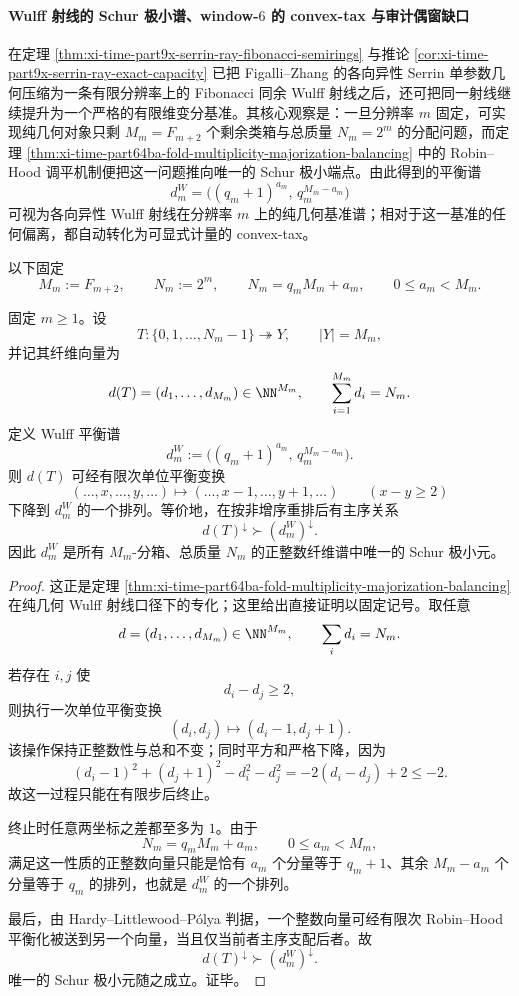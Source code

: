 \paragraph{Wulff 射线的 Schur 极小谱、window-\texorpdfstring{$6$}{6} 的 convex-tax 与审计偶窗缺口}
在定理 \ref{thm:xi-time-part9x-serrin-ray-fibonacci-semirings} 与推论 \ref{cor:xi-time-part9x-serrin-ray-exact-capacity} 已把 Figalli--Zhang 的各向异性 Serrin 单参数几何压缩为一条有限分辨率上的 Fibonacci 同余 Wulff 射线之后，还可把同一射线继续提升为一个严格的有限维变分基准。其核心观察是：一旦分辨率 \(m\) 固定，可实现纯几何对象只剩 \(M_m=F_{m+2}\) 个剩余类箱与总质量 \(N_m=2^m\) 的分配问题，而定理 \ref{thm:xi-time-part64ba-fold-multiplicity-majorization-balancing} 中的 Robin--Hood 调平机制便把这一问题推向唯一的 Schur 极小端点。由此得到的平衡谱
\[
d_m^{W}=\bigl((q_m+1)^{a_m},\,q_m^{M_m-a_m}\bigr)
\]
可视为各向异性 Wulff 射线在分辨率 \(m\) 上的纯几何基准谱；相对于这一基准的任何偏离，都自动转化为可显式计量的 convex-tax。

以下固定
\[
M_m:=F_{m+2},\qquad
N_m:=2^m,\qquad
N_m=q_mM_m+a_m,\qquad
0\le a_m<M_m.
\]

\begin{theorem}\label{thm:xi-time-part9xaa-wulff-schur-minimal-spectrum}
固定 \(m\ge 1\)。设
\[
T:\{0,1,\dots,N_m-1\}\twoheadrightarrow Y,
\qquad
|Y|=M_m,
\]
并记其纤维向量为
\[
d(T)=(d_1,\dots,d_{M_m})\in\NN^{M_m},
\qquad
\sum_{i=1}^{M_m}d_i=N_m.
\]
定义 Wulff 平衡谱
\[
d_m^{W}:=\bigl((q_m+1)^{a_m},\,q_m^{M_m-a_m}\bigr).
\]
则 \(d(T)\) 可经有限次单位平衡变换
\[
(\ldots,x,\ldots,y,\ldots)\longmapsto (\ldots,x-1,\ldots,y+1,\ldots)
\qquad (x-y\ge 2)
\]
下降到 \(d_m^{W}\) 的一个排列。等价地，在按非增序重排后有主序关系
\[
d(T)^{\downarrow}\succ (d_m^{W})^{\downarrow}.
\]
因此 \(d_m^{W}\) 是所有 \(M_m\)-分箱、总质量 \(N_m\) 的正整数纤维谱中唯一的 Schur 极小元。
\end{theorem}
\begin{proof}
这正是定理 \ref{thm:xi-time-part64ba-fold-multiplicity-majorization-balancing} 在纯几何 Wulff 射线口径下的专化；这里给出直接证明以固定记号。取任意
\[
d=(d_1,\dots,d_{M_m})\in\NN^{M_m},
\qquad
\sum_i d_i=N_m.
\]
若存在 \(i,j\) 使
\[
d_i-d_j\ge 2,
\]
则执行一次单位平衡变换
\[
(d_i,d_j)\mapsto(d_i-1,d_j+1).
\]
该操作保持正整数性与总和不变；同时平方和严格下降，因为
\[
(d_i-1)^2+(d_j+1)^2-d_i^2-d_j^2
=
-2(d_i-d_j)+2
\le -2.
\]
故这一过程只能在有限步后终止。

终止时任意两坐标之差都至多为 \(1\)。由于
\[
N_m=q_mM_m+a_m,
\qquad
0\le a_m<M_m,
\]
满足这一性质的正整数向量只能是恰有 \(a_m\) 个分量等于 \(q_m+1\)、其余 \(M_m-a_m\) 个分量等于 \(q_m\) 的排列，也就是 \(d_m^{W}\) 的一个排列。

最后，由 Hardy--Littlewood--Pólya 判据，一个整数向量可经有限次 Robin--Hood 平衡化被送到另一个向量，当且仅当前者主序支配后者。故
\[
d(T)^{\downarrow}\succ (d_m^{W})^{\downarrow}.
\]
唯一的 Schur 极小元随之成立。证毕。
\end{proof}

